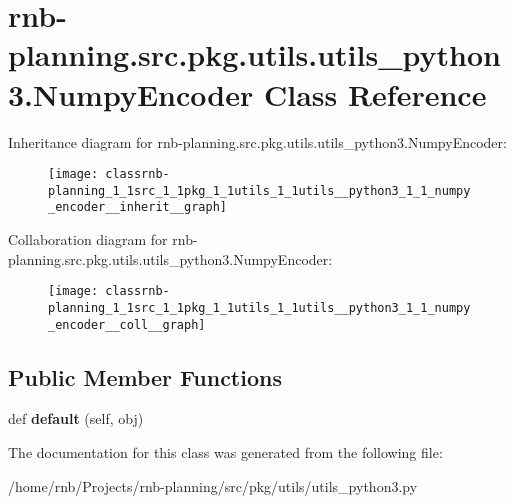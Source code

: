 \hypertarget{classrnb-planning_1_1src_1_1pkg_1_1utils_1_1utils__python3_1_1_numpy_encoder}{}\section{rnb-\/planning.src.\+pkg.\+utils.\+utils\+\_\+python3.\+Numpy\+Encoder Class Reference}
\label{classrnb-planning_1_1src_1_1pkg_1_1utils_1_1utils__python3_1_1_numpy_encoder}


Inheritance diagram for rnb-\/planning.src.\+pkg.\+utils.\+utils\+\_\+python3.\+Numpy\+Encoder\+:\nopagebreak
\begin{figure}[H]
\begin{center}
\leavevmode
\texttt{[image: classrnb-planning\_1\_1src\_1\_1pkg\_1\_1utils\_1\_1utils\_\_python3\_1\_1\_numpy\_encoder\_\_inherit\_\_graph]}
\end{center}
\end{figure}


Collaboration diagram for rnb-\/planning.src.\+pkg.\+utils.\+utils\+\_\+python3.\+Numpy\+Encoder\+:\nopagebreak
\begin{figure}[H]
\begin{center}
\leavevmode
\texttt{[image: classrnb-planning\_1\_1src\_1\_1pkg\_1\_1utils\_1\_1utils\_\_python3\_1\_1\_numpy\_encoder\_\_coll\_\_graph]}
\end{center}
\end{figure}
\subsection*{Public Member Functions}
\begin{DoxyCompactItemize}
\item 
\mbox{\label{classrnb-planning_1_1src_1_1pkg_1_1utils_1_1utils__python3_1_1_numpy_encoder_ad76c28d68334716885ab99757896b73e}} 
def {\bfseries default} (self, obj)
\end{DoxyCompactItemize}


The documentation for this class was generated from the following file\+:\begin{DoxyCompactItemize}
\item 
/home/rnb/\+Projects/rnb-\/planning/src/pkg/utils/utils\+\_\+python3.\+py\end{DoxyCompactItemize}

